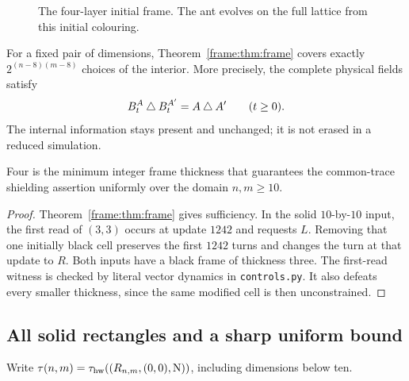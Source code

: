 \begin{figure}[ht]
\centering
{}
\caption{The four-layer initial frame. The ant evolves on the full lattice from this initial colouring.}\label{frame:fig:frame}
\end{figure}

For a fixed pair of dimensions, Theorem~\ref{frame:thm:frame} covers exactly $2^{(n-8)(m-8)}$ choices of the interior. More precisely, the complete physical fields satisfy
\begin{equation}\label{frame:eq:field-difference}
 B^A_t\mathbin{\triangle} B^{A'}_t=A\mathbin{\triangle} A'\qquad(t\ge0).
\end{equation}
The internal information stays present and unchanged; it is not erased in a reduced simulation.

\begin{proposition}\label{frame:prop:thickness}
Four is the minimum integer frame thickness that guarantees the common-trace shielding assertion uniformly over the domain $n,m\ge10$.
\end{proposition}
\begin{proof}
Theorem~\ref{frame:thm:frame} gives sufficiency. In the solid $10$-by-$10$ input, the first read of $(3,3)$ occurs at update $1242$ and requests $L$. Removing that one initially black cell preserves the first $1242$ turns and changes the turn at that update to $R$. Both inputs have a black frame of thickness three. The first-read witness is checked by literal vector dynamics in \texttt{controls.py}. It also defeats every smaller thickness, since the same modified cell is then unconstrained.
\end{proof}

\subsection{All solid rectangles and a sharp uniform bound}
Write $\tau(n,m)=\tau_{\rm hw}((R_{n,m},(0,0),\mathrm N))$, including dimensions below ten.

